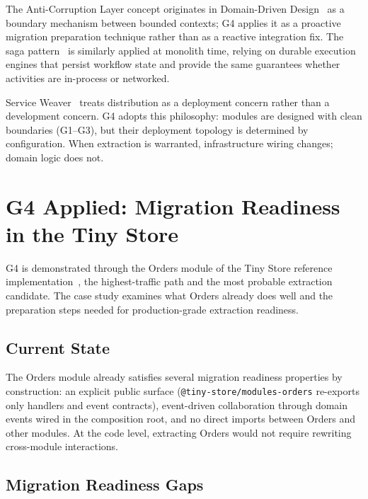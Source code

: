The Anti-Corruption Layer concept originates in Domain-Driven Design~\cite{evans2003ddd} as a boundary mechanism between bounded contexts; G4 applies it as a proactive migration preparation technique rather than as a reactive integration fix. The saga pattern~\cite{richardson2018microservices,newman2019monolith} is similarly applied at monolith time, relying on durable execution engines that persist workflow state and provide the same guarantees whether activities are in-process or networked.

Service Weaver~\cite{ghemawat2023towards} treats distribution as a deployment concern rather than a development concern. G4 adopts this philosophy: modules are designed with clean boundaries (G1--G3), but their deployment topology is determined by configuration. When extraction is warranted, infrastructure wiring changes; domain logic does not.


\section*{G4 Applied: Migration Readiness in the Tiny Store}
\label{sec:g4-applied}

G4 is demonstrated through the Orders module of the Tiny Store reference implementation~\cite{tinystore2026}, the highest-traffic path and the most probable extraction candidate. The case study examines what Orders already does well and the preparation steps needed for production-grade extraction readiness.

\subsection*{Current State}

The Orders module already satisfies several migration readiness properties by construction: an explicit public surface (\texttt{@tiny-store/modules-orders} re-exports only handlers and event contracts), event-driven collaboration through domain events wired in the composition root, and no direct imports between Orders and other modules. At the code level, extracting Orders would not require rewriting cross-module interactions.

\subsection*{Migration Readiness Gaps}

